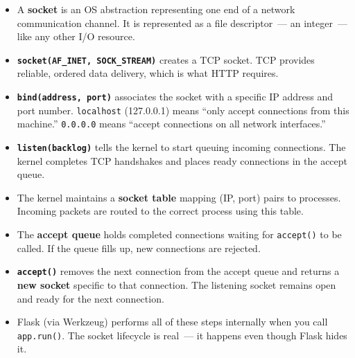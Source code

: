\label{03-network-capability:key-takeaways}
\begin{takeaways}

\begin{itemize}
\tightlist
\item
  A \textbf{socket} is an OS abstraction representing one end of a network communication channel. It is represented as a file descriptor~--- an integer~--- like any other I/O resource.
\item
  \textbf{\texttt{socket(AF\_}\allowbreak{}\texttt{INET,}\allowbreak{}\texttt{\ SOCK\_}\allowbreak{}\texttt{STREAM)}} creates a TCP socket. TCP provides reliable, ordered data delivery, which is what HTTP requires.
\item
  \textbf{\texttt{bind(address,}\allowbreak{}\texttt{\ port)}} associates the socket with a specific IP address and port number. \texttt{localhost} (127.0.0.1) means ``only accept connections from this machine.'' \texttt{0.0.0.0} means ``accept connections on all network interfaces.''
\item
  \textbf{\texttt{listen(backlog)}} tells the kernel to start queuing incoming connections. The kernel completes TCP handshakes and places ready connections in the accept queue.
\item
  The kernel maintains a \textbf{socket table} mapping (IP, port) pairs to processes. Incoming packets are routed to the correct process using this table.
\item
  The \textbf{accept queue} holds completed connections waiting for \texttt{accept()} to be called. If the queue fills up, new connections are rejected.
\item
  \textbf{\texttt{accept()}} removes the next connection from the accept queue and returns a \textbf{new socket} specific to that connection. The listening socket remains open and ready for the next connection.
\item
  Flask (via Werkzeug) performs all of these steps internally when you call \texttt{app.run()}. The socket lifecycle is real~--- it happens even though Flask hides it.
\end{itemize}

\end{takeaways}

\label{03-network-capability:exercises}

